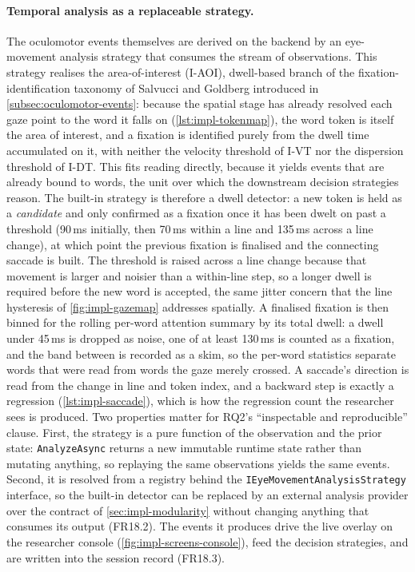 \paragraph{Temporal analysis as a replaceable strategy.}
The oculomotor events themselves are derived on the backend by an eye-movement analysis strategy that consumes the stream of observations.
This strategy realises the area-of-interest (I-AOI), dwell-based branch of the fixation-identification taxonomy of Salvucci and Goldberg introduced in \cref{subsec:oculomotor-events}: because the spatial stage has already resolved each gaze point to the word it falls on (\cref{lst:impl-tokenmap}), the word token is itself the area of interest, and a fixation is identified purely from the dwell time accumulated on it, with neither the velocity threshold of I-VT nor the dispersion threshold of I-DT.
This fits reading directly, because it yields events that are already bound to words, the unit over which the downstream decision strategies reason.
The built-in strategy is therefore a dwell detector: a new token is held as a \emph{candidate} and only confirmed as a fixation once it has been dwelt on past a threshold (90\,ms initially, then 70\,ms within a line and 135\,ms across a line change), at which point the previous fixation is finalised and the connecting saccade is built.
The threshold is raised across a line change because that movement is larger and noisier than a within-line step, so a longer dwell is required before the new word is accepted, the same jitter concern that the line hysteresis of \cref{fig:impl-gazemap} addresses spatially.
A finalised fixation is then binned for the rolling per-word attention summary by its total dwell: a dwell under 45\,ms is dropped as noise, one of at least 130\,ms is counted as a fixation, and the band between is recorded as a skim, so the per-word statistics separate words that were read from words the gaze merely crossed.
A saccade's direction is read from the change in line and token index, and a backward step is exactly a regression (\cref{lst:impl-saccade}), which is how the regression count the researcher sees is produced.
Two properties matter for RQ2's ``inspectable and reproducible'' clause.
First, the strategy is a pure function of the observation and the prior state: \texttt{AnalyzeAsync} returns a new immutable runtime state rather than mutating anything, so replaying the same observations yields the same events.
Second, it is resolved from a registry behind the \texttt{IEyeMovementAnalysisStrategy} interface, so the built-in detector can be replaced by an external analysis provider over the contract of \cref{sec:impl-modularity} without changing anything that consumes its output (FR18.2).
The events it produces drive the live overlay on the researcher console (\cref{fig:impl-screens-console}), feed the decision strategies, and are written into the session record (FR18.3).

